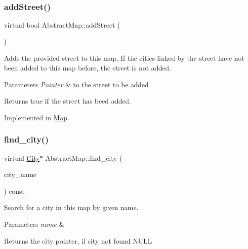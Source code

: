 \subsubsection{\texorpdfstring{add\+Street()}{addStreet()}}
{\footnotesize\ttfamily virtual bool Abstract\+Map\+::add\+Street (\begin{DoxyParamCaption}\item[{\hyperlink{class_street}{Street} $\ast$}]{ }\end{DoxyParamCaption})\hspace{0.3cm}{\ttfamily [pure virtual]}}



Adds the provided street to this map. If the cities linked by the street have not been added to this map before, the street is not added. 


\begin{DoxyParams}{Parameters}
{\em Pointer} & to the street to be added \\
\hline
\end{DoxyParams}
\begin{DoxyReturn}{Returns}
true if the street has beed added. 
\end{DoxyReturn}


Implemented in \hyperlink{class_map_a9e5ad7aea193a11e3a5e2f0bb045e818}{Map}.

\mbox{\label{class_abstract_map_abda0a780cdd294491b1dff5c088b96a2}} 
\subsubsection{\texorpdfstring{find\+\_\+city()}{find\_city()}}
{\footnotesize\ttfamily virtual \hyperlink{class_city}{City}$\ast$ Abstract\+Map\+::find\+\_\+city (\begin{DoxyParamCaption}\item[{const Q\+String}]{city\+\_\+name }\end{DoxyParamCaption}) const\hspace{0.3cm}{\ttfamily [pure virtual]}}



Search for a city in this map by given name. 


\begin{DoxyParams}{Parameters}
{\em name} & \\
\hline
\end{DoxyParams}
\begin{DoxyReturn}{Returns}
the city pointer, if city not found N\+U\+LL 
\end{DoxyReturn}


